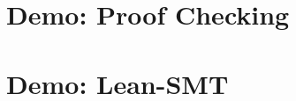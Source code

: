 \documentclass[usepdftitle=false,aspectratio=169,usenames,dvipsnames]{beamer}
\begin{document}


\section{Demo: Proof Checking}

\section{Demo: Lean-SMT}

\end{document}
